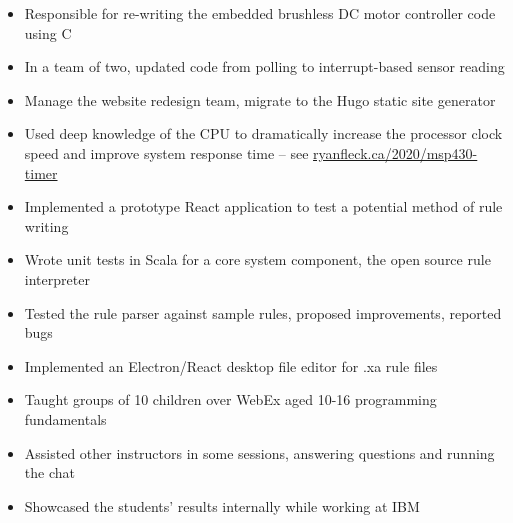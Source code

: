 \documentclass[]{rcf_cv}
\begin{document}
		\begin{itemize}
			\setlength\itemsep{-0.4em}
			\renewcommand\labelitemi{--}
			
			\item Responsible for re-writing the embedded brushless DC motor controller code using C
			\item In a team of two, updated code from polling to interrupt-based sensor reading
			\item Manage the website redesign team, migrate to the Hugo static site generator
			\item Used deep knowledge of the CPU to dramatically increase the processor clock speed and improve system response time -- see \href{https://www.ryanfleck.ca/2020/msp430-timer/}{ryanfleck.ca/2020/msp430-timer}
			
		\end{itemize}
	
		\begin{itemize}
			\setlength\itemsep{-0.4em}
			\renewcommand\labelitemi{--}
			
		\item Implemented a prototype React application to test a potential method of rule writing
	\item Wrote unit tests in Scala for a core system component, the open source rule interpreter
	\item Tested the rule parser against sample rules, proposed improvements, reported bugs
	\item Implemented an Electron/React desktop file editor for .xa rule files
			
			
		\end{itemize}
			
			
\begin{itemize}
	\setlength\itemsep{-0.4em}
	\renewcommand\labelitemi{--}
	

	
	
			\item Taught groups of 10 children over WebEx aged 10-16 programming fundamentals
	\item Assisted other instructors in some sessions, answering questions and running the chat
	\item Showcased the students' results internally while working at IBM
	
		\end{itemize}
\end{document}
